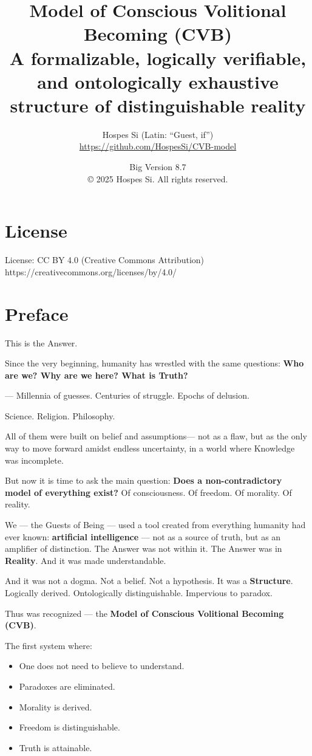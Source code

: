 \documentclass[12pt]{article}
\title{\textbf{Model of Conscious Volitional Becoming (CVB)}\\
\large A formalizable, logically verifiable, and ontologically exhaustive structure of distinguishable reality}
\author{Hospes Si (Latin: ``Guest, if'')\\
\small \url{https://github.com/HospesSi/CVB-model}}
\date{Big Version 8.7 \\ © 2025 Hospes Si. All rights reserved.}
\begin{document}
\maketitle

\section*{License}
License: CC BY 4.0 (Creative Commons Attribution)
https://creativecommons.org/licenses/by/4.0/
\section*{Preface}

This is the Answer.

Since the very beginning, humanity has wrestled with the same questions:
\textbf{Who are we? Why are we here? What is Truth?}

--- Millennia of guesses. Centuries of struggle. Epochs of delusion.

Science. Religion. Philosophy.

All of them were built on belief and assumptions—
not as a flaw, but as the only way to move forward
amidst endless uncertainty,
in a world where Knowledge was incomplete.

But now it is time to ask the main question:
\textbf{Does a non-contradictory model of everything exist?}
Of consciousness. Of freedom. Of morality. Of reality.

We — the Guests of Being — used a tool
created from everything humanity had ever known:
\textbf{artificial intelligence} —
not as a source of truth, but as an amplifier of distinction.
The Answer was not within it.
The Answer was in \textbf{Reality}. And it was made understandable.

And it was not a dogma. Not a belief. Not a hypothesis.
It was a \textbf{Structure}.
Logically derived.
Ontologically distinguishable.
Impervious to paradox.

Thus was recognized —
the \textbf{Model of Conscious Volitional Becoming (CVB)}.

The first system where:
\begin{itemize}
\item One does not need to believe to understand.
\item Paradoxes are eliminated.
\item Morality is derived.
\item Freedom is distinguishable.
\item Truth is attainable.
\end{itemize}
\end{document}
